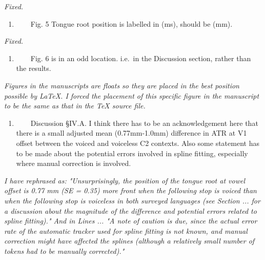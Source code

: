 \documentclass[]{article}
\providecommand{\tightlist}{%
  \setlength{\itemsep}{0pt}\setlength{\parskip}{0pt}}
\begin{document}
\begin{adjustwidth}{1cm}{} \textit{
Fixed.
} \end{adjustwidth}

\begin{enumerate}
\def\labelenumi{\arabic{enumi}.}
\setcounter{enumi}{13}
\tightlist
\item
  ~~~~Fig. 5 Tongue root position is labelled in (ms), should be (mm).
\end{enumerate}

\begin{adjustwidth}{1cm}{} \textit{
Fixed.
} \end{adjustwidth}

\begin{enumerate}
\def\labelenumi{\arabic{enumi}.}
\setcounter{enumi}{14}
\tightlist
\item
  ~~~~Fig. 6 is in an odd location. i.e.~in the Discussion section,
  rather than the results.
\end{enumerate}

\begin{adjustwidth}{1cm}{} \textit{
Figures in the manuscripts are floats so they are placed in the best position possible by LaTeX. I forced the placement of this specific figure in the manuscript to be the same as that in the TeX source file.
} \end{adjustwidth}

\begin{enumerate}
\def\labelenumi{\arabic{enumi}.}
\setcounter{enumi}{15}
\tightlist
\item
  ~~~~Discussion §IV.A. I think there has to be an acknowledgement here
  that there is a small adjusted mean (0.77mm-1.0mm) difference in ATR
  at V1 offset between the voiced and voiceless C2 contexts. Also some
  statement has to be made about the potential errors involved in spline
  fitting, especially where manual correction is involved.
\end{enumerate}

\begin{adjustwidth}{1cm}{} \textit{
I have rephrased as: "Unsurprisingly, the position of the tongue root at vowel offset is 0.77 mm (SE = 0.35) more front when the following stop is voiced than when the following stop is voiceless in both surveyed languages (see Section ... for a discussion about the magnitude of the difference and potential errors related to spline fitting)." And in Lines ... "A note of caution is due, since the actual error rate of the automatic tracker used for spline fitting is not known, and manual correction might have affected the splines (although a relatively small number of tokens had to be manually corrected)."
} \end{adjustwidth}
\end{document}
